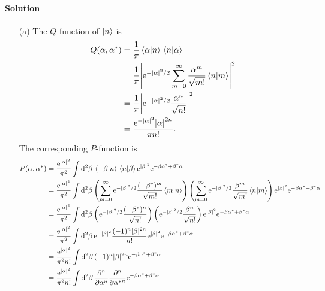 \documentclass[hyperref, a4paper]{article}
\newcommand*{\ee}{\mathrm{e}}
\begin{document}
\paragraph{Solution}
\begin{itemize}
    \item[(a)] The $Q$-function of $\ket{n}$ is 
    \[
        \begin{aligned}
            Q(\alpha, \alpha^*) &= \frac{1}{\pi} \braket*{\alpha}{n} \braket*{n}{\alpha} \\
            &= \frac{1}{\pi} \abs{ \ee^{-\abs*{\alpha}^2 / 2} \sum_{m=0}^\infty \frac{\alpha^m}{\sqrt{m!}} \braket*{n}{m} }^2 \\
            &= \frac{1}{\pi} \abs{\ee^{-\abs{\alpha}^2/2} \frac{\alpha^n}{\sqrt{n!}}}^2 \\
            &= \frac{\ee^{-\abs{\alpha}^2} \abs{\alpha}^{2n}}{\pi n!}.
        \end{aligned}
    \] 
    The corresponding $P$-function is 
    \[
        \begin{aligned}
            P(\alpha, \alpha^*) &= \frac{\ee^{\left| \alpha \right|^{2}}}{\pi^{2}} \int \dd[2]{\beta} \braket*{-\beta}{n} \braket*{n}{\beta} \ee^{|\beta|^{2}} \ee^{-\beta \alpha^{*}+\beta^{*} \alpha} \\
            &= \frac{\ee^{\left| \alpha \right|^{2}}}{\pi^{2}} \int \dd[2]{\beta} \left( \sum_{m=0}^\infty \ee^{-\abs{\beta}^2/2} \frac{(-\beta^*)^m}{\sqrt{m!}} \braket*{m}{n} \right) \left( \sum_{m=0}^\infty \ee^{-\abs{\beta}^2/2} \frac{\beta^m}{\sqrt{m!}} \braket*{n}{m} \right) \ee^{|\beta|^{2}} \ee^{-\beta \alpha^{*}+\beta^{*} \alpha} \\
            &= \frac{\ee^{\left| \alpha \right|^{2}}}{\pi^{2}} \int \dd[2]{\beta} \left( \ee^{-\abs{\beta}^2/2} \frac{(-\beta^*)^n}{\sqrt{n!}} \right) \left( \ee^{-\abs{\beta}^2/2} \frac{\beta^n}{\sqrt{n!}} \right) \ee^{|\beta|^{2}} \ee^{-\beta \alpha^{*}+\beta^{*} \alpha} \\
            &= \frac{\ee^{\left| \alpha \right|^{2}}}{\pi^{2}} \int \dd[2]{\beta} \ee^{-|\beta|^{2}} \frac{(-1)^{n}|\beta|^{2 n}}{n !}  \ee^{|\beta|^{2}} \ee^{-\beta \alpha^{*}+\beta^{*} \alpha} \\
            &= \frac{\ee^{\left| \alpha \right|^{2}}}{\pi^{2} n !} \int \dd[2]{\beta}  (-1)^{n} |\beta|^{2 n}  \ee^{-\beta \alpha^{*}+\beta^{*} \alpha} \\
            &= \frac{\ee^{\left| \alpha \right|^{2}}}{\pi^{2} n !} \int \dd[2]{\beta}  \pdv[n]{\alpha} \pdv[n]{{\alpha^*}}  \ee^{-\beta \alpha^{*}+\beta^{*} \alpha} \\

\end{aligned}\]
\end{itemize}
\end{document}
